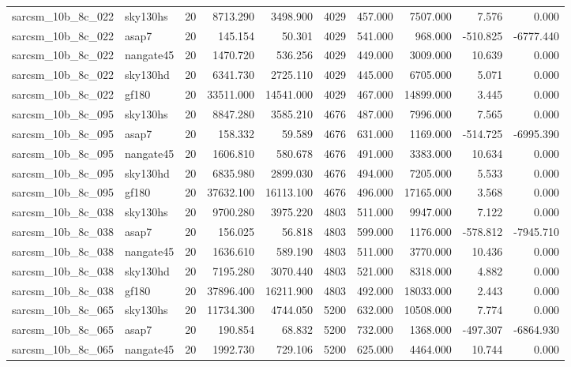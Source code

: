 \begin{tabular}{llrrrrrrrr}
sarcsm\_10b\_8c\_022 & sky130hs & 20 & 8713.290 & 3498.900 & 4029 & 457.000 & 7507.000 & 7.576 & 0.000 \\
sarcsm\_10b\_8c\_022 & asap7 & 20 & 145.154 & 50.301 & 4029 & 541.000 & 968.000 & -510.825 & -6777.440 \\
sarcsm\_10b\_8c\_022 & nangate45 & 20 & 1470.720 & 536.256 & 4029 & 449.000 & 3009.000 & 10.639 & 0.000 \\
sarcsm\_10b\_8c\_022 & sky130hd & 20 & 6341.730 & 2725.110 & 4029 & 445.000 & 6705.000 & 5.071 & 0.000 \\
sarcsm\_10b\_8c\_022 & gf180 & 20 & 33511.000 & 14541.000 & 4029 & 467.000 & 14899.000 & 3.445 & 0.000 \\
sarcsm\_10b\_8c\_095 & sky130hs & 20 & 8847.280 & 3585.210 & 4676 & 487.000 & 7996.000 & 7.565 & 0.000 \\
sarcsm\_10b\_8c\_095 & asap7 & 20 & 158.332 & 59.589 & 4676 & 631.000 & 1169.000 & -514.725 & -6995.390 \\
sarcsm\_10b\_8c\_095 & nangate45 & 20 & 1606.810 & 580.678 & 4676 & 491.000 & 3383.000 & 10.634 & 0.000 \\
sarcsm\_10b\_8c\_095 & sky130hd & 20 & 6835.980 & 2899.030 & 4676 & 494.000 & 7205.000 & 5.533 & 0.000 \\
sarcsm\_10b\_8c\_095 & gf180 & 20 & 37632.100 & 16113.100 & 4676 & 496.000 & 17165.000 & 3.568 & 0.000 \\
sarcsm\_10b\_8c\_038 & sky130hs & 20 & 9700.280 & 3975.220 & 4803 & 511.000 & 9947.000 & 7.122 & 0.000 \\
sarcsm\_10b\_8c\_038 & asap7 & 20 & 156.025 & 56.818 & 4803 & 599.000 & 1176.000 & -578.812 & -7945.710 \\
sarcsm\_10b\_8c\_038 & nangate45 & 20 & 1636.610 & 589.190 & 4803 & 511.000 & 3770.000 & 10.436 & 0.000 \\
sarcsm\_10b\_8c\_038 & sky130hd & 20 & 7195.280 & 3070.440 & 4803 & 521.000 & 8318.000 & 4.882 & 0.000 \\
sarcsm\_10b\_8c\_038 & gf180 & 20 & 37896.400 & 16211.900 & 4803 & 492.000 & 18033.000 & 2.443 & 0.000 \\
sarcsm\_10b\_8c\_065 & sky130hs & 20 & 11734.300 & 4744.050 & 5200 & 632.000 & 10508.000 & 7.774 & 0.000 \\
sarcsm\_10b\_8c\_065 & asap7 & 20 & 190.854 & 68.832 & 5200 & 732.000 & 1368.000 & -497.307 & -6864.930 \\
sarcsm\_10b\_8c\_065 & nangate45 & 20 & 1992.730 & 729.106 & 5200 & 625.000 & 4464.000 & 10.744 & 0.000 \\

\end{tabular}

